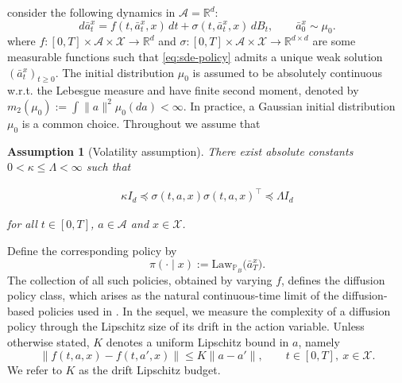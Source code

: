 \documentclass{article}
\newtheorem{asmp}{Assumption}[section]
\newcommand{\1}{\mathbbm{1}}
\newcommand{\Law}{\mathrm{Law}}
\newcommand{\renyuan}[1]{\textcolor{cyan}{[\textbf{renyuan}:#1]}}
\newcommand{\vv}[1]{\textcolor{orange}{[\textbf{viet}:#1]}}
\numberwithin{equation}{section}
\def\to{\rightarrow}
\begin{document}
consider  the following    dynamics in $\mathcal A=\mathbb R^d$:
\begin{equation}\label{eq:sde-policy}
d\bar a_t^{x}
=
f(t,\bar a_t^{x},x)\,dt
+
\sigma(t,\bar a^x_t,x)\,dB_t,
\qquad
\bar a_0^{x}\sim \mu_0.
\end{equation}
where  
$ 
f:[0,T]\times \mathcal A\times \mathcal X\to \mathbb R^d$ and 
$\sigma:[0,T]\times \mathcal A\times \mathcal X\to \mathbb R^{d\times d}$  
are some measurable functions such that
\eqref{eq:sde-policy}
admits a unique weak solution 
 $(\bar a^x_t)_{t\ge 0}$. The initial distribution $\mu_0$
 is assumed to {be absolutely continuous w.r.t.  the Lebesgue measure} and have finite second moment, denoted by $m_2(\mu_0):=\int \|a\|^2\mu_0(da)<\infty$. In practice, a Gaussian initial distribution $\mu_0$ is a common choice. Throughout we assume that
\begin{asmp}[Volatility assumption]\label{ass:vol_bdd}
 There exist absolute constants $0<\kappa\leq \Lambda<\infty$ such that 
 
 \begin{align}\label{sigmabound}\kappa I_{d}\preceq \sigma(t, a,x)\sigma(t, a,x)^{\top}\preceq \Lambda I_{d}
 \end{align}
 
 for all $t\in[0,T]$, $a\in \mathcal A$ and $x\in \mathcal{X}$.
\end{asmp}


 
Define the corresponding policy  by  
\begin{equation}\label{eq:diffusion-policy-law}
\pi(\cdot\mid x)
:=
\Law_{\mathbb P_B}\bigl(\bar a_T^{x}\bigr).
\end{equation}
The collection of all such policies,
obtained by varying 
$f$, defines the diffusion policy class, which arises as the natural continuous-time limit of the diffusion-based policies used in
\cite{balim2025model,ding2024diffusion,
  ma2025efficient,psenka2024learning, 
ren2025diffusion,wang2024diffusion}.  In the sequel, we measure the complexity of a diffusion policy through the Lipschitz size of its drift in the action variable. Unless otherwise stated, \(K\) denotes a uniform Lipschitz bound in \(a\), namely
\[
\|f(t,a,x)-f(t,a',x)\|\le K\|a-a'\|,
\qquad t\in[0,T],\ x\in\mathcal X .
\]
We refer to \(K\) as the drift Lipschitz budget.
\end{document}
